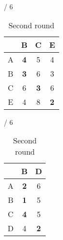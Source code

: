 \documentclass[a4paper, 11 pt, article, accentcolor=tud7b]{tudreport}
\begin{document}
\begin{table}[h]
\begin{subtable}[b]{\textwidth / 6}
\begin{tabular}{| c | c | c | c |}
	    \hline
	      & B                   & C           & E           \\ \hline
	    A & \textbf{4}          & 5           & 4           \\ \hline
	    B & \textbf{3}          & 6           & 3           \\ \hline
	    C & 6                   & \textbf{3}  & 6           \\ \hline
	    E & 4                   & 8           & \textbf{2}  \\ \hline
	    \end{tabular}
	    \caption{$D^{D}$}
	  \end{subtable}
	  \hfill
	  \begin{subtable}[b]{\textwidth / 6}
	    \begin{tabular}{| c | c | c |}
	    \hline
	      & B          & D           \\ \hline
	    A & \textbf{2} & 6           \\ \hline
	    B & \textbf{1} & 5           \\ \hline
	    C & \textbf{4} & 5           \\ \hline
	    D & 4          & \textbf{2}  \\ \hline
	    \end{tabular}
	    \caption{$D^{E}$}
	  \end{subtable}
	  \caption{Second round}
	\end{table}
\end{document}
